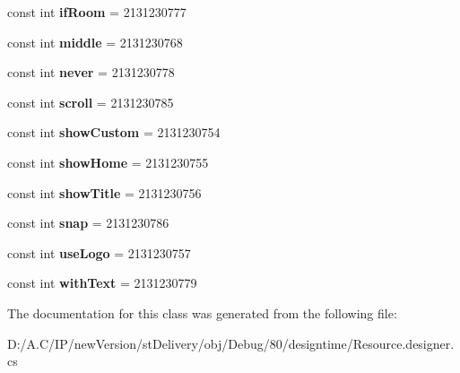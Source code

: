 \begin{DoxyCompactItemize}
const int {\bfseries if\+Room} = 2131230777
\item 
\mbox{\label{classst_delivery_1_1_resource_1_1_id_a26c31c0383700e3bb3c4c3f560038b23}} 
const int {\bfseries middle} = 2131230768
\item 
\mbox{\label{classst_delivery_1_1_resource_1_1_id_a128bbc91fe8ecfee821f893c0e3f6472}} 
const int {\bfseries never} = 2131230778
\item 
\mbox{\label{classst_delivery_1_1_resource_1_1_id_a0a4f028eaf87c4eb246d10006fd39816}} 
const int {\bfseries scroll} = 2131230785
\item 
\mbox{\label{classst_delivery_1_1_resource_1_1_id_a9709a430120565ad2c07c2c1266c3ac5}} 
const int {\bfseries show\+Custom} = 2131230754
\item 
\mbox{\label{classst_delivery_1_1_resource_1_1_id_a1f3e92a40f8ecdac55c957bc33aa969d}} 
const int {\bfseries show\+Home} = 2131230755
\item 
\mbox{\label{classst_delivery_1_1_resource_1_1_id_abe61445430acfbc62887d0a6179a94a6}} 
const int {\bfseries show\+Title} = 2131230756
\item 
\mbox{\label{classst_delivery_1_1_resource_1_1_id_ab382485a9bba477d18706f087bedf0f0}} 
const int {\bfseries snap} = 2131230786
\item 
\mbox{\label{classst_delivery_1_1_resource_1_1_id_abc7bae276e1c3b4bda70b12891b16a8b}} 
const int {\bfseries use\+Logo} = 2131230757
\item 
\mbox{\label{classst_delivery_1_1_resource_1_1_id_aa586256714100fef9fee99bf9e2f090b}} 
const int {\bfseries with\+Text} = 2131230779
\end{DoxyCompactItemize}


The documentation for this class was generated from the following file\+:\begin{DoxyCompactItemize}
\item 
D\+:/\+A.\+C/\+I\+P/new\+Version/st\+Delivery/obj/\+Debug/80/designtime/Resource.\+designer.\+cs\end{DoxyCompactItemize}
